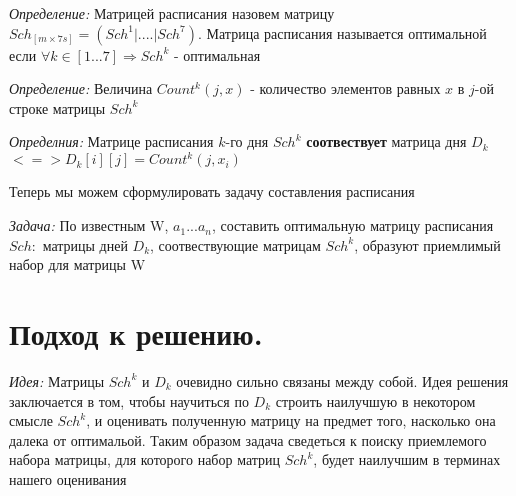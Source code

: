 \documentclass{article}
\begin{document}
\par
\textit{Определение:} Матрицей расписания назовем матрицу \(Sch_{[m \times 7s]} = (Sch^{1}|....|Sch^{7})\).
Матрица расписания называется оптимальной если \(\forall k \in [1...7] \Rightarrow Sch^{k}\) - оптимальная 
\par
\textit{Определение:} Величина \(Count^{k}(j, x)\) -  количество элементов равных \(x\) в \(j\)-ой строке матрицы \(Sch^{k}\)
\par
\textit{Определния:} Матрице расписания \(k\)-го дня   \(Sch^{k}\) \textbf{соотвествует} матрица дня \(D_k\) \(<=> D_k[i][j] = Count^{k}(j, x_i)\) 
\par
Теперь мы можем  сформулировать задачу составления расписания
\par
\textit{Задача:} По известным W, \(a_1...a_n\), составить оптимальную матрицу расписания \(Sch:\) матрицы дней \(D_k\),  соотвествующие матрицам \(Sch^{k}\), образуют
приемлимый набор для матрицы W
\section{Подход к решению.} 
\textit{Идея:} Матрицы \(Sch^{k}\) и \(D_k\) очевидно сильно связаны между собой. Идея решения заключается в том, чтобы научиться по \(D_k\) строить наилучшую в некотором смысле \(Sch^{k}\), и оценивать полученную матрицу на предмет того, насколько она далека от оптимальой. Таким образом задача сведеться к поиску приемлемого набора матрицы, для которого набор матриц \(Sch^{k}\), будет наилучшим в терминах нашего оценивания
\end{document}
